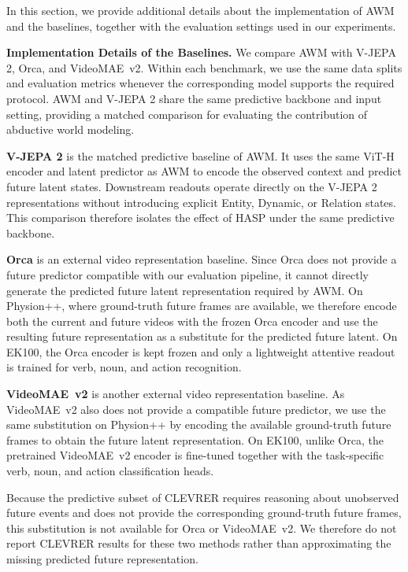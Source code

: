 \documentclass{article}
\begin{document}
In this section, we provide additional details about the implementation of AWM and the baselines, together with the evaluation settings used in our experiments.

\textbf{Implementation Details of the Baselines.}
We compare AWM with V-JEPA 2, Orca, and VideoMAE~v2. Within each benchmark, we use the same data splits and evaluation metrics whenever the corresponding model supports the required protocol. AWM and V-JEPA 2 share the same predictive backbone and input setting, providing a matched comparison for evaluating the contribution of abductive world modeling.

\textbf{V-JEPA 2}
is the matched predictive baseline of AWM. It uses the same ViT-H encoder and latent predictor as AWM to encode the observed context and predict future latent states. Downstream readouts operate directly on the V-JEPA 2 representations without introducing explicit Entity, Dynamic, or Relation states. This comparison therefore isolates the effect of HASP under the same predictive backbone.

\textbf{Orca}
is an external video representation baseline. Since Orca does not provide a future predictor compatible with our evaluation pipeline, it cannot directly generate the predicted future latent representation required by AWM. On Physion++, where ground-truth future frames are available, we therefore encode both the current and future videos with the frozen Orca encoder and use the resulting future representation as a substitute for the predicted future latent. On EK100, the Orca encoder is kept frozen and only a lightweight attentive readout is trained for verb, noun, and action recognition.

\textbf{VideoMAE~v2}
is another external video representation baseline. As VideoMAE~v2 also does not provide a compatible future predictor, we use the same substitution on Physion++ by encoding the available ground-truth future frames to obtain the future latent representation. On EK100, unlike Orca, the pretrained VideoMAE~v2 encoder is fine-tuned together with the task-specific verb, noun, and action classification heads.

Because the predictive subset of CLEVRER requires reasoning about unobserved future events and does not provide the corresponding ground-truth future frames, this substitution is not available for Orca or VideoMAE~v2. We therefore do not report CLEVRER results for these two methods rather than approximating the missing predicted future representation.
\end{document}

